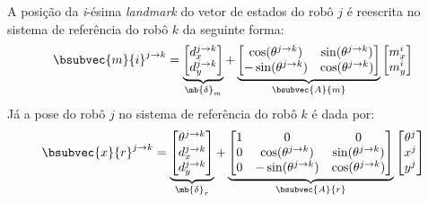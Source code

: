 A posição da \textit{i}-ésima \textit{landmark} do vetor de estados do 
robô $j$ é reescrita no sistema de referência do robô $k$ da seguinte 
forma:
\begin{equation}
  \bsubvec{m}{i}^{j\to k} = \underbrace{\begin{bmatrix}
    d_x^{j\to k}\\ d_y^{j\to k}
  \end{bmatrix}}_{\mb{\delta}_m}
  + \underbrace{\begin{bmatrix}
      \cos(\theta^{j\to k}) & \sin(\theta^{j\to k}) \\
      -\sin(\theta^{j\to k}) & \cos(\theta^{j\to k})
    \end{bmatrix}}_{\bsubvec{A}{m}}
  \begin{bmatrix}
    m_x^i \\ m_y^i
  \end{bmatrix}
\end{equation}
Já a pose do robô $j$ no sistema de referência do robô $k$ é dada por:
\begin{equation}
  \bsubvec{x}{r}^{j\to k} =  \underbrace{\begin{bmatrix}
    \theta^{j\to k} \\ d_x^{j\to k}\\ d_y^{j\to k}\\
  \end{bmatrix}}_{\mb{\delta}_r}
  + \underbrace{\begin{bmatrix}
      1 & 0 & 0\\
      0 & \cos(\theta^{j\to k}) & \sin(\theta^{j\to k})\\
      0& -\sin(\theta^{j\to k}) & \cos(\theta^{j\to k})
  \end{bmatrix}}_{\bsubvec{A}{r}}
  \begin{bmatrix}
    \theta^j\\ x^j \\ y^j
  \end{bmatrix} 
\end{equation}

